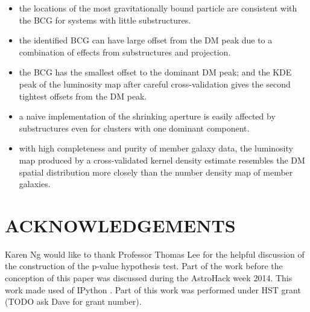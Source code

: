 \begin{itemize}
		\item the locations of the most gravitationally bound particle are consistent 
			with the BCG for systems with little substructures.  \\

		\item the identified BCG can have large offset from the DM peak due to a
			combination of effects from substructures and projection. \\

		\item the BCG has the smallest offset to the dominant DM peak; and  
			the KDE peak of the luminosity map after careful cross-validation 
			gives the second tightest offsets from the DM peak.  \\
		
		\item a naive implementation of the shrinking aperture is easily affected 
			by substructures even for clusters with one
			dominant component. \\  

		\item with high completeness and purity of member galaxy data, the
			luminosity map produced by a cross-validated kernel density estimate 
			resembles the DM spatial distribution more closely than 
			the number density map of member galaxies. \\ 

	
\end{itemize}


\section{ACKNOWLEDGEMENTS}
Karen Ng would like to thank Professor Thomas Lee for the helpful discussion of 
the construction of the p-value hypothesis test. 
Part of the work before the conception of this paper was discussed during 
the AstroHack week 2014. This work made used of {\sc IPython}
\citep{Perez2007}.
Part of this work was performed under HST grant (TODO ask Dave for grant
number). 
% 
% 
% 
% 
% 
% 
% 


